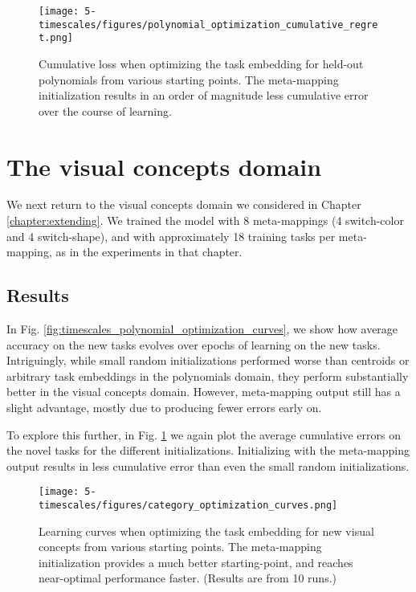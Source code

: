 \begin{figure}
\centering
\texttt{[image: 5-timescales/figures/polynomial\_optimization\_cumulative\_regret.png]}
\caption[Cumulative loss when optimizing the task embedding for held-out polynomials from various starting points.]{Cumulative loss when optimizing the task embedding for held-out polynomials from various starting points. The meta-mapping initialization results in an order of magnitude less cumulative error over the course of learning.} \label{fig:timescales_polynomial_optimization_regret}
\end{figure}

\section{The visual concepts domain}

We next return to the visual concepts domain we considered in Chapter \ref{chapter:extending}. We trained the model with 8 meta-mappings (4 switch-color and 4 switch-shape), and with approximately 18 training tasks per meta-mapping, as in the experiments in that chapter. 
\subsection{Results}
In Fig. \ref{fig:timescales_polynomial_optimization_curves}, we show how average accuracy on the new tasks evolves over epochs of learning on the new tasks. Intriguingly, while small random initializations performed worse than centroids or arbitrary task embeddings in the polynomials domain, they perform substantially better in the visual concepts domain. However, meta-mapping output still has a slight advantage, mostly due to producing fewer errors early on. \par 

To explore this further, in Fig. \ref{fig:timescales_polynomial_optimization_regret} we again plot the average cumulative errors on the novel tasks for the different initializations. Initializing with the meta-mapping output results in less cumulative error than even the small random initializations. \par
\begin{figure}
\centering
\texttt{[image: 5-timescales/figures/category\_optimization\_curves.png]}
\caption[Learning curves when optimizing the task embedding for new visual concepts from various starting points.]{Learning curves when optimizing the task embedding for new visual concepts from various starting points. The meta-mapping initialization provides a much better starting-point, and reaches near-optimal performance faster. (Results are from 10 runs.)} \label{fig:timescales_category_optimization_curves}
\end{figure}

